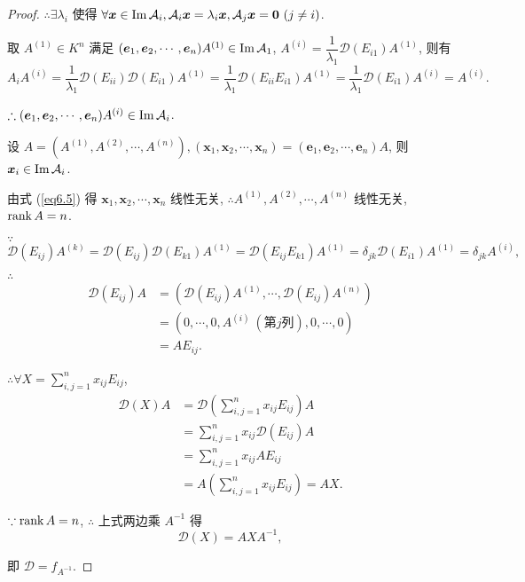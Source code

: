 \documentclass[color=black,device=normal,lang=cn,mode=geye]{elegantnote}
\begin{document}
\begin{proof}
    $\therefore\exists\lambda_i$ 使得 $\forall\boldsymbol{x}\in\im\mathcal{A}_i,\mathcal{A}_i\boldsymbol{x}=\lambda_i\boldsymbol{x},\mathcal{A}_j\boldsymbol{x}=\boldsymbol{0}\ (j\neq i)$.

    取 $A^{(1)}\in K^n$ 满足 $(\boldsymbol{e}_1,\boldsymbol{e}_2,\cdots,\boldsymbol{e}_n)A^{(1)}\in\operatorname{Im}\mathcal{A}_1$, $A^{(i)}=\dfrac{1}{\lambda_1}\mathcal{D}(E_{i1})A^{(1)}$, 则有
    \[A_iA^{(i)}=\dfrac{1}{\lambda_1}\mathcal{D}(E_{ii})\mathcal{D}(E_{i1})A^{(1)}=\dfrac{1}{\lambda_1}\mathcal{D}(E_{ii}E_{i1})A^{(1)}=\dfrac{1}{\lambda_1}\mathcal{D}(E_{i1})A^{(i)}=A^{(i)}.\]

    $\therefore(\boldsymbol{e}_1,\boldsymbol{e}_2,\cdots,\boldsymbol{e}_n)A^{(i)}\in\operatorname{Im}\mathcal{A}_i$.

    设 $A=(A^{(1)},A^{(2)},\cdots,A^{(n)}),(\boldsymbol{x}_1,\boldsymbol{x}_2,\cdots,\boldsymbol{x}_n)=(\boldsymbol{e}_1,\boldsymbol{e}_2,\cdots,\boldsymbol{e}_n)A$, 则 $\boldsymbol{x}_i\in\operatorname{Im}\mathcal{A}_i$.
    
    由式 (\ref{eq6.5}) 得 $\boldsymbol{x}_1,\boldsymbol{x}_2,\cdots,\boldsymbol{x}_n$ 线性无关, $\therefore A^{(1)},A^{(2)},\cdots,A^{(n)}$ 线性无关, $\operatorname{rank} A=n$.

    $\because$
    \[\mathcal{D}(E_{ij})A^{(k)}=\mathcal{D}(E_{ij})\mathcal{D}(E_{k1})A^{(1)}=\mathcal{D}(E_{ij}E_{k1})A^{(1)}=\delta_{jk}\mathcal{D}(E_{i1})A^{(1)}=\delta_{jk}A^{(i)},\]

    $\therefore$
    \begin{align*}
        \mathcal{D}(E_{ij})A & =(\mathcal{D}(E_{ij})A^{(1)},\cdots,\mathcal{D}(E_{ij})A^{(n)}) \\
        & =(0,\cdots,0,A^{(i)}\ (\text{第}j\text{列}),0,\cdots,0) \\
        & =AE_{ij}.
    \end{align*}

    $\therefore\forall X=\sum\limits_{i,j=1}^nx_{ij}E_{ij}$,
    \begin{align*}
        \mathcal{D}(X)A & =\mathcal{D}\left(\sum\limits_{i,j=1}^nx_{ij}E_{ij}\right)A \\
        & =\sum\limits_{i,j=1}^nx_{ij}\mathcal{D}(E_{ij})A \\
        & =\sum\limits_{i,j=1}^nx_{ij}AE_{ij} \\
        & =A\left(\sum\limits_{i,j=1}^nx_{ij}E_{ij}\right)=AX.
    \end{align*}

    $\because\operatorname{rank} A=n$, $\therefore$ 上式两边乘 $A^{-1}$ 得
    \[\mathcal{D}(X)=AXA^{-1},\]

    即 $\mathcal{D}=f_{A^{-1}}$.
\end{proof}
\end{document}
